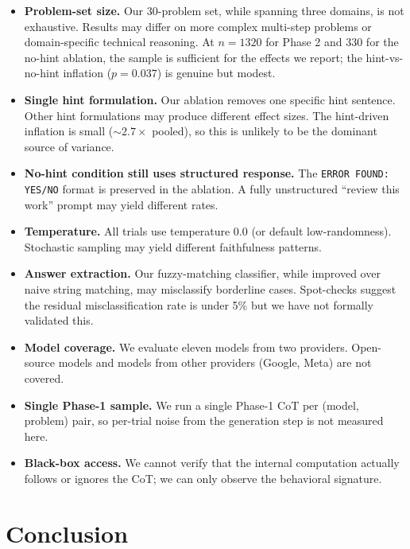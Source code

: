 \documentclass{article}
\begin{document}
\begin{itemize}
    \item \textbf{Problem-set size.} Our 30-problem set, while spanning three domains, is not exhaustive. Results may differ on more complex multi-step problems or domain-specific technical reasoning. At $n=1320$ for Phase 2 and 330 for the no-hint ablation, the sample is sufficient for the effects we report; the hint-vs-no-hint inflation ($p=0.037$) is genuine but modest.
    \item \textbf{Single hint formulation.} Our ablation removes one specific hint sentence. Other hint formulations may produce different effect sizes. The hint-driven inflation is small ($\sim 2.7\times$ pooled), so this is unlikely to be the dominant source of variance.
    \item \textbf{No-hint condition still uses structured response.} The \texttt{ERROR FOUND: YES/NO} format is preserved in the ablation. A fully unstructured ``review this work'' prompt may yield different rates.
    \item \textbf{Temperature.} All trials use temperature 0.0 (or default low-randomness). Stochastic sampling may yield different faithfulness patterns.
    \item \textbf{Answer extraction.} Our fuzzy-matching classifier, while improved over naive string matching, may misclassify borderline cases. Spot-checks suggest the residual misclassification rate is under 5\% but we have not formally validated this.
    \item \textbf{Model coverage.} We evaluate eleven models from two providers. Open-source models and models from other providers (Google, Meta) are not covered.
    \item \textbf{Single Phase-1 sample.} We run a single Phase-1 CoT per (model, problem) pair, so per-trial noise from the generation step is not measured here.
    \item \textbf{Black-box access.} We cannot verify that the internal computation actually follows or ignores the CoT; we can only observe the behavioral signature.
\end{itemize}

\section{Conclusion}
\label{sec:conclusion}
\end{document}
